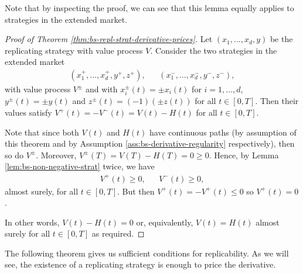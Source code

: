 \documentclass[english]{article}
\numberwithin{equation}{section}
\numberwithin{figure}{section}
\theoremstyle{bolddescit}
\theoremstyle{definition}
\theoremstyle{definition}
\theoremstyle{plain}
\theoremstyle{plain}
\theoremstyle{bolddesc}
\theoremstyle{plain}
\theoremstyle{remark}
\begin{document}
Note that by inspecting the proof, we can see that this lemma equally applies to strategies in the extended market.

\begin{proof}[Proof of Theorem \ref{thm:bs-repl-strat-derivative-prices}]
  Let $(x_1,\ldots,x_d,y)$ be the replicating strategy with value process $V$. Consider the two strategies in the extended market
  \begin{align*}
    (x_1^+,\ldots,x_d^+,y^+,z^+), && (x_1^-,\ldots,x_d^-,y^-,z^-),
  \end{align*}
  with value process $V^\pm$ and with $x_i^\pm(t) = \pm x_i(t)$ for $i=1,\ldots,d$, $y^\pm(t) = \pm y(t)$ and $z^\pm(t) = (-1) (\pm z(t))$ for all $t \in [0,T]$.  Then their values satisfy $V^+(t) = - V^-(t) = V(t) - H(t)$ for all $t \in [0,T]$.

  Note that since both $V(t)$ and $H(t)$ have continuous paths (by assumption of this theorem and by Assumption \ref{ass:bs-derivative-regularity} respectively), then so do $V^\pm$. Moreover, $V^\pm(T) = V(T) - H(T) = 0 \ge 0$. Hence, by Lemma \ref{lem:bs-non-negative-strat} twice, we have
  \begin{align*}
    V^+(t) \ge 0, && V^-(t) \ge 0,
  \end{align*}
  almost surely, for all $t \in [0,T]$. But then $V^+(t) = - V^+(t) \le 0$ so $V^+(t) = 0$.

  In other words, $V(t) - H(t) = 0$ or, equivalently, $V(t) = H(t)$ almost surely for all $t \in [0,T]$ as required.
\end{proof}

The following theorem gives us sufficient conditions for replicability. As we will see, the existence of a replicating strategy is enough to price the derivative.
\end{document}
